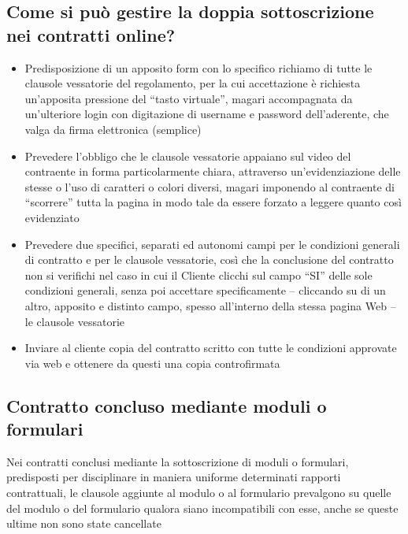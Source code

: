 \subsection{Come si può gestire la doppia sottoscrizione nei contratti online?}
\begin{itemize}
    \item Predisposizione di un apposito form con lo specifico richiamo di
        tutte le clausole vessatorie del regolamento, per la cui accettazione è
        richiesta un’apposita pressione del “tasto virtuale”, magari
        accompagnata da un’ulteriore login con digitazione di username e
        password dell’aderente, che valga da firma elettronica (semplice)
    \item Prevedere l’obbligo che le clausole vessatorie appaiano sul video del
        contraente in forma particolarmente chiara, attraverso
        un'evidenziazione delle stesse o l’uso di caratteri o colori diversi,
        magari imponendo al contraente di “scorrere” tutta la pagina in modo
        tale da essere forzato a leggere quanto così evidenziato
    \item Prevedere due specifici, separati ed autonomi campi per le condizioni
        generali di contratto e per le clausole vessatorie, così che la
        conclusione del contratto non si verifichi nel caso in cui il Cliente
        clicchi sul campo “SI” delle sole condizioni generali, senza poi
        accettare specificamente – cliccando su di un altro, apposito e
        distinto campo, spesso all’interno della stessa pagina Web – le
        clausole vessatorie
    \item Inviare al cliente copia del contratto scritto con tutte le
        condizioni approvate via web e ottenere da questi una copia
        controfirmata
\end{itemize}

\subsection{Contratto concluso mediante moduli o formulari}
Nei contratti conclusi mediante la sottoscrizione di moduli o formulari, predisposti per disciplinare in maniera uniforme determinati
rapporti contrattuali, le clausole aggiunte al modulo o al formulario prevalgono su quelle del modulo o del formulario qualora siano
incompatibili con esse, anche se queste ultime non sono state cancellate

